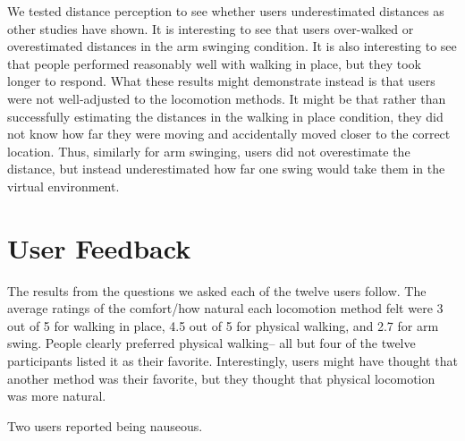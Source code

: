 \documentclass[titlepage]{article}
\theoremstyle{definition}
\theoremstyle{proof}
\begin{document}
We tested distance perception to see whether users underestimated distances as
other studies have shown. %
It is interesting to see that users over-walked or overestimated distances in the arm swinging condition.
It is also interesting to see that people performed reasonably well with walking in place,
but they took longer to respond.
What these results might demonstrate instead is that users were not well-adjusted to the locomotion methods.
It might be that rather than successfully estimating the distances
in the walking in place condition,
they did not know how far they were moving and accidentally moved closer to the correct location.
Thus, similarly for arm swinging, users did not overestimate the distance,
but instead underestimated how far one swing would take them in the virtual environment.

\clearpage
\section{User Feedback}
The results from the questions we asked each of the twelve users follow.
The average ratings of the comfort/how natural each locomotion method felt were
3 out of 5 for walking in place,
4.5 out of 5 for physical walking,
and 2.7 for arm swing.
People clearly preferred physical walking--
all but four of the twelve participants listed it as their favorite.
Interestingly, users might have thought that another method was their favorite,
but they thought that physical locomotion was more natural.

Two users reported being nauseous.
\end{document}
